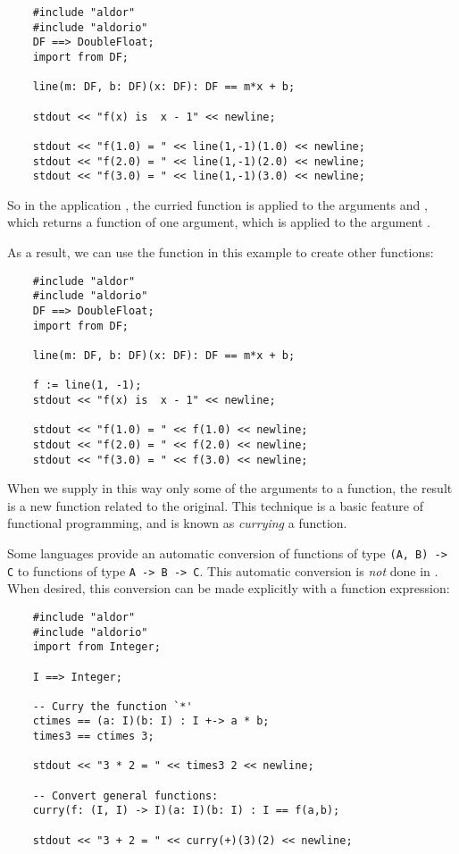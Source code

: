 \begin{small}
\begin{verbatim}
    #include "aldor"
    #include "aldorio"
    DF ==> DoubleFloat;
    import from DF;
    
    line(m: DF, b: DF)(x: DF): DF == m*x + b;

    stdout << "f(x) is  x - 1" << newline;

    stdout << "f(1.0) = " << line(1,-1)(1.0) << newline;
    stdout << "f(2.0) = " << line(1,-1)(2.0) << newline;
    stdout << "f(3.0) = " << line(1,-1)(3.0) << newline;
\end{verbatim}
\end{small}

So in the application , the curried function 
is applied to the arguments  and , which returns a function
of one argument, which is applied to the argument .

As a result, we can use the  function in this example
to create other functions:

\begin{small}
\begin{verbatim}
    #include "aldor"
    #include "aldorio"
    DF ==> DoubleFloat;
    import from DF;
    
    line(m: DF, b: DF)(x: DF): DF == m*x + b;

    f := line(1, -1);
    stdout << "f(x) is  x - 1" << newline;

    stdout << "f(1.0) = " << f(1.0) << newline;
    stdout << "f(2.0) = " << f(2.0) << newline;
    stdout << "f(3.0) = " << f(3.0) << newline;
\end{verbatim}
\end{small}

When we supply in this way only some of the arguments to a function,
the result is a new function related to the original.
This technique is a basic feature of functional programming,
and is known as {\em currying\/} a function.

Some languages provide an automatic conversion of functions of
type \verb"(A, B) -> C" to functions of type \verb"A -> B -> C".
This automatic conversion is {\em not} done in \asharp{}.
When desired, this conversion can be made explicitly with a 
function expression:

\begin{small}
\begin{verbatim}
    #include "aldor"
    #include "aldorio"
    import from Integer;

    I ==> Integer;

    -- Curry the function `*'
    ctimes == (a: I)(b: I) : I +-> a * b;
    times3 == ctimes 3;
    
    stdout << "3 * 2 = " << times3 2 << newline;

    -- Convert general functions:
    curry(f: (I, I) -> I)(a: I)(b: I) : I == f(a,b);

    stdout << "3 + 2 = " << curry(+)(3)(2) << newline;
\end{verbatim}
\end{small}
